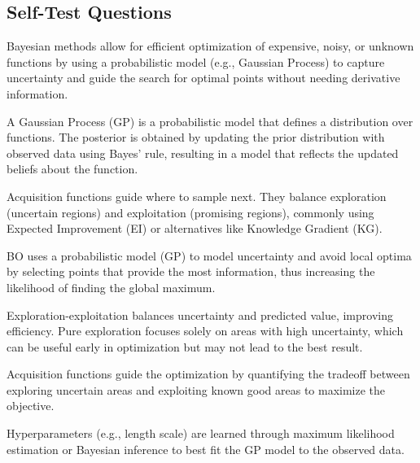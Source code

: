 \subsection{Self-Test Questions}
\begin{enumerate}

\newline
Bayesian methods allow for efficient optimization of expensive, noisy, or unknown functions 
by using a probabilistic model (e.g., Gaussian Process) to capture uncertainty and guide the 
search for optimal points without needing derivative information.

\newline
A Gaussian Process (GP) is a probabilistic model that defines a distribution over functions. 
The posterior is obtained by updating the prior distribution with observed data using Bayes' 
rule, resulting in a model that reflects the updated beliefs about the function.

\newline
Acquisition functions guide where to sample next. They balance exploration (uncertain 
regions) and exploitation (promising regions), commonly using Expected Improvement (EI) or 
alternatives like Knowledge Gradient (KG).

\newline
BO uses a probabilistic model (GP) to model uncertainty and avoid local optima by selecting 
points that provide the most information, thus increasing the likelihood of finding the 
global maximum.

\newline
Exploration-exploitation balances uncertainty and predicted value, improving efficiency. 
Pure exploration focuses solely on areas with high uncertainty, which can be useful early in 
optimization but may not lead to the best result.

\newline
Acquisition functions guide the optimization by quantifying the tradeoff between 
exploring uncertain areas and exploiting known good areas to maximize the objective.

\newline
Hyperparameters (e.g., length scale) are learned through maximum likelihood estimation or 
Bayesian inference to best fit the GP model to the observed data.


\end{enumerate}
